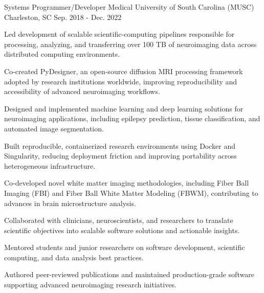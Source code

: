 \begin{cventries}
  \cventry
    {Systems Programmer/Developer} %
    {Medical University of South Carolina (MUSC)} %
    {Charleston, SC} %
    {Sep. 2018 - Dec. 2022} %
    {
      \begin{cvitems} %
        \item {Led development of scalable scientific-computing pipelines responsible for processing, analyzing, and transferring over 100 TB of neuroimaging data across distributed computing environments.}
        \item {Co-created PyDesigner, an open-source diffusion MRI processing framework adopted by research institutions worldwide, improving reproducibility and accessibility of advanced neuroimaging workflows.}
        \item {Designed and implemented machine learning and deep learning solutions for neuroimaging applications, including epilepsy prediction, tissue classification, and automated image segmentation.}
        \item {Built reproducible, containerized research environments using Docker and Singularity, reducing deployment friction and improving portability across heterogeneous infrastructure.}
        \item {Co-developed novel white matter imaging methodologies, including Fiber Ball Imaging (FBI) and Fiber Ball White Matter Modeling (FBWM), contributing to advances in brain microstructure analysis.}
        \item {Collaborated with clinicians, neuroscientists, and researchers to translate scientific objectives into scalable software solutions and actionable insights.}
        \item {Mentored students and junior researchers on software development, scientific computing, and data analysis best practices.}
        \item {Authored peer-reviewed publications and maintained production-grade software supporting advanced neuroimaging research initiatives.}
      \end{cvitems}
    }


\end{cventries}
